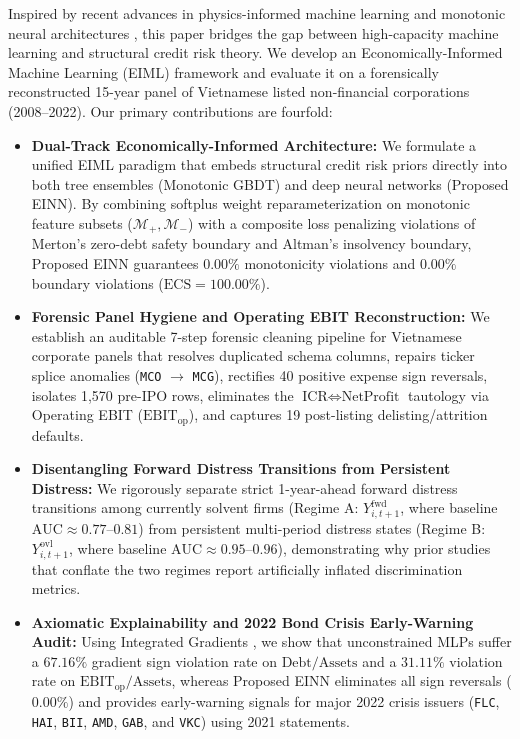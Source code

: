 \documentclass[pdflatex,sn-mathphys-num,twocolumn]{sn-jnl}
\theoremstyle{thmstyleone}
\theoremstyle{thmstyletwo}
\theoremstyle{thmstylethree}
\begin{document}
Inspired by recent advances in physics-informed machine learning \citep{raissi2019physics,karniadakis2021physics} and monotonic neural architectures \citep{sill1997monotonic,you2017deep,runje2023constrained}, this paper bridges the gap between high-capacity machine learning and structural credit risk theory. We develop an Economically-Informed Machine Learning (EIML) framework and evaluate it on a forensically reconstructed 15-year panel of Vietnamese listed non-financial corporations (2008--2022). Our primary contributions are fourfold:
\begin{itemize}
    \item \textbf{Dual-Track Economically-Informed Architecture:} We formulate a unified EIML paradigm that embeds structural credit risk priors directly into both tree ensembles (Monotonic GBDT) and deep neural networks (Proposed EINN). By combining softplus weight reparameterization on monotonic feature subsets ($\mathcal{M}_+, \mathcal{M}_-$) with a composite loss penalizing violations of Merton's zero-debt safety boundary and Altman's insolvency boundary, Proposed EINN guarantees $0.00\%$ monotonicity violations and $0.00\%$ boundary violations ($\text{ECS} = 100.00\%$).
    \item \textbf{Forensic Panel Hygiene and Operating EBIT Reconstruction:} We establish an auditable 7-step forensic cleaning pipeline for Vietnamese corporate panels that resolves duplicated schema columns, repairs ticker splice anomalies (\texttt{MCO} $\to$ \texttt{MCG}), rectifies 40 positive expense sign reversals, isolates 1,570 pre-IPO rows, eliminates the $\text{ICR} \iff \text{NetProfit}$ tautology via Operating EBIT ($\text{EBIT}_{\text{op}}$), and captures 19 post-listing delisting/attrition defaults.
    \item \textbf{Disentangling Forward Distress Transitions from Persistent Distress:} We rigorously separate strict 1-year-ahead forward distress transitions among currently solvent firms (Regime A: $Y_{i,t+1}^{\text{fwd}}$, where baseline $\text{AUC} \approx 0.77\text{--}0.81$) from persistent multi-period distress states (Regime B: $Y_{i,t+1}^{\text{ovl}}$, where baseline $\text{AUC} \approx 0.95\text{--}0.96$), demonstrating why prior studies that conflate the two regimes report artificially inflated discrimination metrics.
    \item \textbf{Axiomatic Explainability and 2022 Bond Crisis Early-Warning Audit:} Using Integrated Gradients \citep{sundararajan2017axiomatic}, we show that unconstrained MLPs suffer a $67.16\%$ gradient sign violation rate on $\text{Debt}/\text{Assets}$ and a $31.11\%$ violation rate on $\text{EBIT}_{\text{op}}/\text{Assets}$, whereas Proposed EINN eliminates all sign reversals ($0.00\%$) and provides early-warning signals for major 2022 crisis issuers (\texttt{FLC}, \texttt{HAI}, \texttt{BII}, \texttt{AMD}, \texttt{GAB}, and \texttt{VKC}) using 2021 statements.
\end{itemize}
\end{document}
